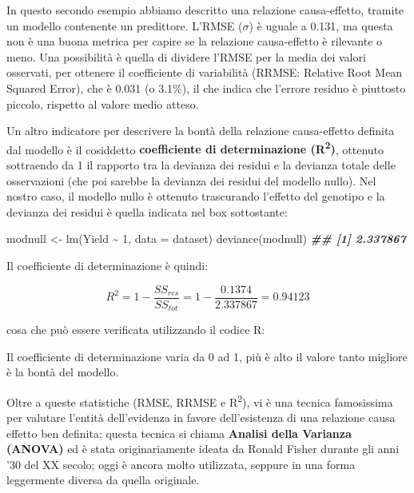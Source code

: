 \documentclass[
  12pt,
]{book}
\newenvironment{Shaded}{\begin{snugshade}}{\end{snugshade}}
\newcommand{\AttributeTok}[1]{\textcolor[rgb]{0.77,0.63,0.00}{#1}}
\newcommand{\DecValTok}[1]{\textcolor[rgb]{0.00,0.00,0.81}{#1}}
\newcommand{\DocumentationTok}[1]{\textcolor[rgb]{0.56,0.35,0.01}{\textbf{\textit{#1}}}}
\newcommand{\FunctionTok}[1]{\textcolor[rgb]{0.00,0.00,0.00}{#1}}
\newcommand{\NormalTok}[1]{#1}
\newcommand{\OtherTok}[1]{\textcolor[rgb]{0.56,0.35,0.01}{#1}}
\newcommand{\SpecialCharTok}[1]{\textcolor[rgb]{0.00,0.00,0.00}{#1}}
\begin{document}
In questo secondo esempio abbiamo descritto una relazione causa-effetto, tramite un modello contenente un predittore. L'RMSE (\(\sigma\)) è uguale a 0.131, ma questa non è una buona metrica per capire se la relazione causa-effetto è rilevante o meno. Una possibilità è quella di dividere l'RMSE per la media dei valori osservati, per ottenere il coefficiente di variabilità (RRMSE: Relative Root Mean Squared Error), che è 0.031 (o 3.1\%), il che indica che l'errore residuo è piuttosto piccolo, rispetto al valore medio atteso.

Un altro indicatore per descrivere la bontà della relazione causa-effetto definita dal modello è il cosiddetto \textbf{coefficiente di determinazione (R\textsuperscript{2})}, ottenuto sottraendo da 1 il rapporto tra la devianza dei residui e la devianza totale delle osservazioni (che poi sarebbe la devianza dei residui del modello nullo). Nel nostro caso, il modello nullo è ottenuto trascurando l'effetto del genotipo e la devianza dei residui è quella indicata nel box sottostante:

\begin{Shaded}
\begin{Highlighting}[]
\NormalTok{modnull }\OtherTok{\textless{}{-}} \FunctionTok{lm}\NormalTok{(Yield }\SpecialCharTok{\textasciitilde{}} \DecValTok{1}\NormalTok{, }\AttributeTok{data =}\NormalTok{ dataset)}
\FunctionTok{deviance}\NormalTok{(modnull)}
\DocumentationTok{\#\# [1] 2.337867}
\end{Highlighting}
\end{Shaded}

Il coefficiente di determinazione è quindi:

\[R^2 = 1 - \frac{SS_{res}}{SS_{tot}} = 1 - \frac{0.1374}{2.337867} = 0.94123\]

cosa che può essere verificata utilizzando il codice R:

\begin{Shaded}
\end{Shaded}

Il coefficiente di determinazione varia da 0 ad 1, più è alto il valore tanto migliore è la bontà del modello.

Oltre a queste statistiche (RMSE, RRMSE e R\textsuperscript{2}), vi è una tecnica famosissima per valutare l'entità dell'evidenza in favore dell'esistenza di una relazione causa effetto ben definita; questa tecnica si chiama \textbf{Analisi della Varianza (ANOVA)} ed è stata originariamente ideata da Ronald Fisher durante gli anni '30 del XX secolo; oggi è ancora molto utilizzata, seppure in una forma leggermente diversa da quella originale.
\end{document}
